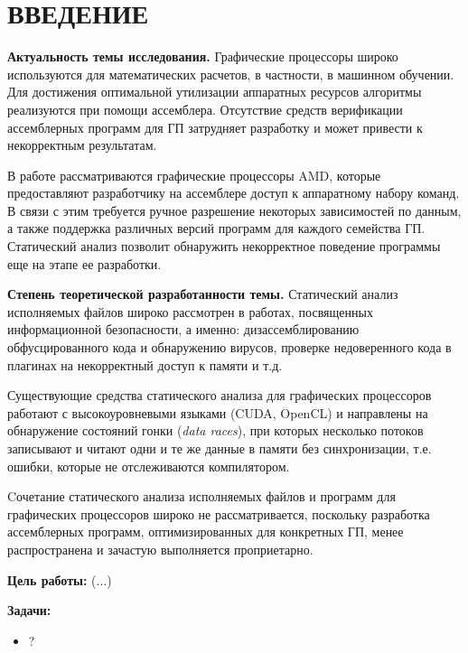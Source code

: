 \documentclass[a4paper,14pt]{extarticle}
\newcommand{\topic}[2]{\textbf{#1.} #2\newline}
\begin{document}
\tableofcontents
\newpage

\section*{ВВЕДЕНИЕ}

\topic{Актуальность темы исследования}{Графические процессоры широко используются
для математических расчетов, в частности, в машинном обучении. Для достижения оптимальной
утилизации аппаратных ресурсов алгоритмы реализуются при помощи ассемблера.
Отсутствие средств верификации ассемблерных программ для ГП затрудняет разработку
и может привести к некорректным результатам.

В работе рассматриваются графические процессоры AMD, которые предоставляют разработчику
на ассемблере доступ к аппаратному набору команд. В связи с этим требуется ручное
разрешение некоторых зависимостей по данным, а также поддержка различных версий программ
для каждого семейства ГП. Статический анализ позволит обнаружить некорректное
поведение программы еще на этапе ее разработки.}

\topic{Степень теоретической разработанности темы}{Статический анализ исполняемых файлов
широко рассмотрен в работах, посвященных информационной безопасности, а именно:
дизассемблированию обфусцированного кода и обнаружению вирусов,
проверке недоверенного кода в плагинах на некорректный доступ к памяти и т.д.

Существующие средства статического анализа для графических процессоров работают с
высокоуровневыми языками (CUDA, OpenCL) и направлены на обнаружение состояний
гонки (\textit{data races}), при которых несколько потоков записывают
и читают одни и те же данные в памяти без синхронизации, т.е. ошибки, которые
не отслеживаются компилятором.

Cочетание статического анализа исполняемых файлов и программ для графических
процессоров широко не рассматривается, поскольку разработка ассемблерных программ,
оптимизированных для конкретных ГП, менее распространена и зачастую выполняется
проприетарно.}

\textbf{Цель работы:} (...)

\textbf{Задачи:}
\begin{itemize}
\item ?
\end{itemize}
\end{document}
